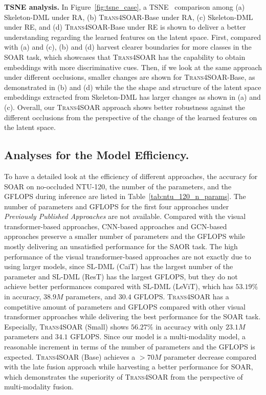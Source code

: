 \documentclass[lettersize,journal]{IEEEtran}
\begin{document}
\noindent\textbf{TSNE analysis. } In Figure~\ref{fig:tsne_case}, a TSNE~\cite{van2008visualizing} comparison among (a) Skeleton-DML under RA, (b) \textsc{Trans4SOAR}-Base under RA, (c) Skeleton-DML under RE, and (d) \textsc{Trans4SOAR}-Base under RE is shown to deliver a better understanding regarding the learned features on the latent space. First, compared with (a) and (c), (b) and (d) harvest clearer boundaries for more classes in the SOAR task, which showcases that \textsc{Trans4SOAR} has the capability to obtain embeddings with more discriminative cues. Then, if we look at the same approach under different occlusions, smaller changes are shown for \textsc{Trans4SOAR}-Base, as demonstrated in (b) and (d) while the the shape and structure of the latent space embeddings extracted from Skeleton-DML has larger changes as shown in (a) and (c). Overall, our \textsc{Trans4SOAR} approach shows better robustness against the different occlusions from the perspective of the change of the learned features on the latent space.

\subsection{Analyses for the Model Efficiency.}
To have a detailed look at the efficiency of different approaches, the accuracy for SOAR on no-occluded NTU-120, the number of the parameters, and the GFLOPS during inference are listed in Table~\ref{tab:ntu_120_n_params}. The number of parameters and GFLOPS for the first four approaches under \textit{Previously Published Approaches} are not available.
Compared with the visual transformer-based approaches, CNN-based approaches and GCN-based approaches preserve a smaller number of parameters and the GFLOPS while mostly delivering an unsatisfied performance for the SAOR task. 
The high performance of the visual transformer-based approaches are not exactly due to using larger models, since SL-DML (CaiT) has the largest number of the parameter and SL-DML (ResT) has the largest GFLOPS, but they do not achieve better performances compared with SL-DML (LeViT), which has $53.19\%$ in accuracy, $38.9M$ parameters, and $30.4$ GFLOPS. \textsc{Trans4SOAR} has a competitive amount of parameters and GFLOPS compared with other visual transformer approaches while delivering the best performance for the SOAR task. Especially, \textsc{Trans4SOAR} (Small) shows $56.27\%$ in accuracy with only $23.1M$ parameters and $34.1$ GFLOPS. Since our model is a multi-modality model, a reasonable increment in terms of the number of parameters and the GFLOPS is expected. \textsc{Trans4SOAR} (Base) achieves a $>70M$ parameter decrease compared with the late fusion approach while harvesting a better performance for SOAR, which demonstrates the superiority of \textsc{Trans4SOAR} from the perspective of multi-modality fusion.
\end{document}

